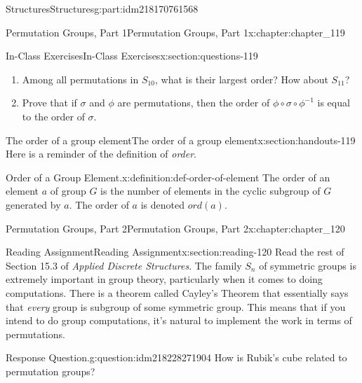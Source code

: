 \documentclass[oneside,10pt,]{book}
\numberwithin{equation}{section}
\begin{document}
\begin{partptx}{Structures}{}{Structures}{}{}{g:part:idm218170761568}
\begin{chapterptx}{Permutation Groups, Part 1}{}{Permutation Groups, Part 1}{}{}{x:chapter:chapter_119}
\begin{sectionptx}{In-Class Exercises}{}{In-Class Exercises}{}{}{x:section:questions-119}
\begin{enumerate}[label=\arabic*.]
\begin{multicols}{3}
\end{multicols}
%
\item{}Among all permutations in \(S_{10}\), what is their largest order?  How about \(S_{11}\)?%
\item{}Prove that if \(\sigma\) and \(\phi\) are permutations, then the order of \(\phi \circ \sigma \circ \phi^{-1}\) is equal to the order of \(\sigma\).%
\end{enumerate}
%
\end{sectionptx}
%
%
\typeout{************************************************}
\typeout{************************************************}
%
\begin{sectionptx}{The order of a group element}{}{The order of a group element}{}{}{x:section:handouts-119}
Here is a reminder of the definition of \emph{order}.%
\begin{definition}{Order of a Group Element.}{x:definition:def-order-of-element}%
%
\label{g:notation:idm218228216272}%
The order of an element \(a\) of group \(G\) is the number of elements in the cyclic subgroup of \(G\) generated by \(a\). The order of \(a\) is denoted \(ord(a)\).%
\end{definition}
\end{sectionptx}
\end{chapterptx}
%
\typeout{************************************************}
\typeout{************************************************}
%
\begin{chapterptx}{Permutation Groups, Part 2}{}{Permutation Groups, Part 2}{}{}{x:chapter:chapter_120}
\index{}%
%
%
\typeout{************************************************}
\typeout{************************************************}
%
\begin{sectionptx}{Reading Assignment}{}{Reading Assignment}{}{}{x:section:reading-120}
Read the rest of  Section 15.3 of \emph{Applied Discrete Structures}. The family \(S_n\) of symmetric groups is extremely important in group theory, particularly when it comes to doing computations.   There is a theorem called Cayley's Theorem that essentially says that \emph{every} group is  subgroup of some symmetric group.  This means that if you intend to do group computations, it's natural to implement the work in terms of permutations.%
\begin{question}{Response Question.}{g:question:idm218228271904}%
How is Rubik's cube related to permutation groups?%

\end{question}
\end{sectionptx}
\end{chapterptx}
\end{partptx}
\end{document}
